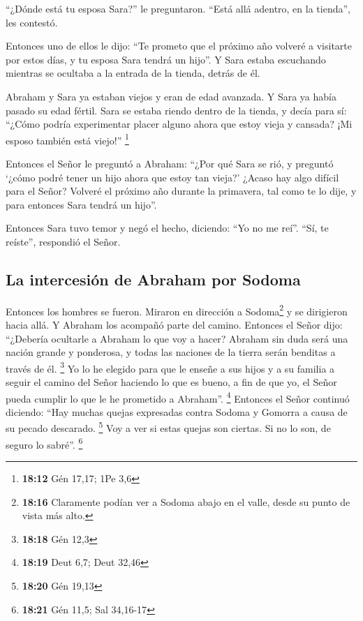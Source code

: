  ``¿Dónde está tu esposa Sara?'' le preguntaron. ``Está
allá adentro, en la tienda'', les contestó.

 Entonces uno de ellos le dijo: ``Te prometo que el
próximo año volveré a visitarte por estos días, y tu esposa Sara tendrá
un hijo''. Y Sara estaba escuchando mientras se ocultaba a la entrada de
la tienda, detrás de él.

 Abraham y Sara ya estaban viejos y eran de edad
avanzada. Y Sara ya había pasado su edad fértil.  Sara se
estaba riendo dentro de la tienda, y decía para sí: ``¿Cómo podría
experimentar placer alguno ahora que estoy vieja y cansada? ¡Mi esposo
también está viejo!'' \footnote{\textbf{18:12} Gén 17,17; 1Pe 3,6}

 Entonces el Señor le preguntó a Abraham: ``¿Por qué Sara
se rió, y preguntó `¿cómo podré tener un hijo ahora que estoy tan
vieja?'  ¿Acaso hay algo difícil para el Señor? Volveré
el próximo año durante la primavera, tal como te lo dije, y para
entonces Sara tendrá un hijo''.

 Entonces Sara tuvo temor y negó el hecho, diciendo: ``Yo
no me reí''. ``Sí, te reíste'', respondió el Señor.

\hypertarget{la-intercesiuxf3n-de-abraham-por-sodoma}{%
\subsection{La intercesión de Abraham por
Sodoma}\label{la-intercesiuxf3n-de-abraham-por-sodoma}}

 Entonces los hombres se fueron. Miraron en dirección a
Sodoma\footnote{\textbf{18:16} Claramente podían ver a Sodoma abajo en
  el valle, desde su punto de vista más alto.} y se dirigieron hacia
allá. Y Abraham los acompañó parte del camino.  Entonces
el Señor dijo: ``¿Debería ocultarle a Abraham lo que voy a hacer?
 Abraham sin duda será una nación grande y ponderosa, y
todas las naciones de la tierra serán benditas a través de él.
\footnote{\textbf{18:18} Gén 12,3}  Yo lo he elegido para
que le enseñe a sus hijos y a su familia a seguir el camino del Señor
haciendo lo que es bueno, a fin de que yo, el Señor pueda cumplir lo que
le he prometido a Abraham''. \footnote{\textbf{18:19} Deut 6,7; Deut
  32,46}  Entonces el Señor continuó diciendo: ``Hay
muchas quejas expresadas contra Sodoma y Gomorra a causa de su pecado
descarado. \footnote{\textbf{18:20} Gén 19,13}  Voy a ver
si estas quejas son ciertas. Si no lo son, de seguro lo sabré''.
\footnote{\textbf{18:21} Gén 11,5; Sal 34,16-17}

